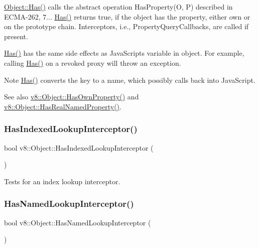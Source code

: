 \mbox{\hyperlink{classv8_1_1Object_a57d4819c2cc13715ed22dd23cdc84d7c}{Object\+::\+Has()}} calls the abstract operation Has\+Property(\+O, P) described in E\+C\+M\+A-\/262, 7... \mbox{\hyperlink{classv8_1_1Object_a57d4819c2cc13715ed22dd23cdc84d7c}{Has()}} returns true, if the object has the property, either own or on the prototype chain. Interceptors, i.\+e., Property\+Query\+Callbacks, are called if present.

\mbox{\hyperlink{classv8_1_1Object_a57d4819c2cc13715ed22dd23cdc84d7c}{Has()}} has the same side effects as Java\+Script\textquotesingle{}s {\ttfamily variable in object}. For example, calling \mbox{\hyperlink{classv8_1_1Object_a57d4819c2cc13715ed22dd23cdc84d7c}{Has()}} on a revoked proxy will throw an exception.

\begin{DoxyNote}{Note}
\mbox{\hyperlink{classv8_1_1Object_a57d4819c2cc13715ed22dd23cdc84d7c}{Has()}} converts the key to a name, which possibly calls back into Java\+Script.
\end{DoxyNote}
See also \mbox{\hyperlink{classv8_1_1Object_acdd3921e95d5bb1a27cea489792607ff}{v8\+::\+Object\+::\+Has\+Own\+Property()}} and \mbox{\hyperlink{classv8_1_1Object_ad830b937c7586fe2086b288ea79935c4}{v8\+::\+Object\+::\+Has\+Real\+Named\+Property()}}. \mbox{\label{classv8_1_1Object_a278913bcd203434870ce5184a538a9af}} 
\subsubsection{\texorpdfstring{Has\+Indexed\+Lookup\+Interceptor()}{HasIndexedLookupInterceptor()}}
{\footnotesize\ttfamily bool v8\+::\+Object\+::\+Has\+Indexed\+Lookup\+Interceptor (\begin{DoxyParamCaption}{ }\end{DoxyParamCaption})}

Tests for an index lookup interceptor. \mbox{\label{classv8_1_1Object_a1e96fcb9ee17101c0299ec68f2cf8610}} 
\subsubsection{\texorpdfstring{Has\+Named\+Lookup\+Interceptor()}{HasNamedLookupInterceptor()}}
{\footnotesize\ttfamily bool v8\+::\+Object\+::\+Has\+Named\+Lookup\+Interceptor (\begin{DoxyParamCaption}{ }\end{DoxyParamCaption})}

